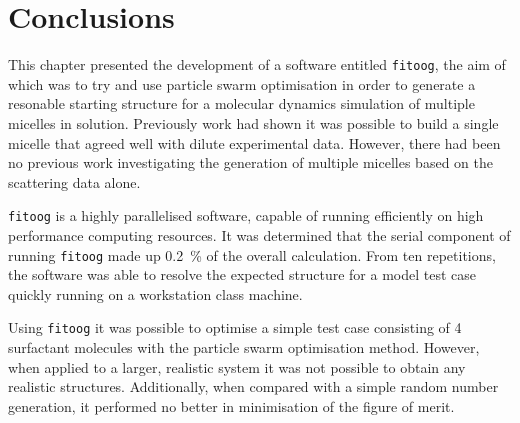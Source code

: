 \section{Conclusions}
This chapter presented the development of a software entitled \texttt{fitoog}, the aim of which was to try and use particle swarm optimisation in order to generate a resonable starting structure for a molecular dynamics simulation of multiple micelles in solution.
Previously work had shown it was possible to build a single micelle that agreed well with dilute experimental data.
However, there had been no previous work investigating the generation of multiple micelles based on the scattering data alone.

\texttt{fitoog} is a highly parallelised software, capable of running efficiently on high performance computing resources.
It was determined that the serial component of running \texttt{fitoog} made up \SI{0.2}{\percent} of the overall calculation.
From ten repetitions, the software was able to resolve the expected structure for a model test case quickly running on a workstation class machine.

Using \texttt{fitoog} it was possible to optimise a simple test case consisting of 4 surfactant molecules with the particle swarm optimisation method.
However, when applied to a larger, realistic system it was not possible to obtain any realistic structures.
Additionally, when compared with a simple random number generation, it performed no better in minimisation of the figure of merit. 
